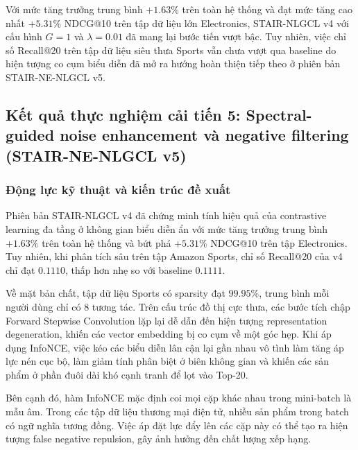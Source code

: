 Với mức tăng trưởng trung bình $+1.63\%$ trên toàn hệ thống và đạt mức tăng cao nhất $+5.31\%$ NDCG@10 trên tập dữ liệu lớn Electronics, STAIR-NLGCL v4 với cấu hình $G=1$ và $\lambda = 0.01$ đã mang lại bước tiến vượt bậc. Tuy nhiên, việc chỉ số Recall@20 trên tập dữ liệu siêu thưa Sports vẫn chưa vượt qua baseline do hiện tượng co cụm biểu diễn đã mở ra hướng hoàn thiện tiếp theo ở phiên bản STAIR-NE-NLGCL v5.

\subsection{Kết quả thực nghiệm cải tiến 5: Spectral-guided noise enhancement và negative filtering (STAIR-NE-NLGCL v5)}

\subsubsection{Động lực kỹ thuật và kiến trúc đề xuất}

Phiên bản STAIR-NLGCL v4 đã chứng minh tính hiệu quả của contrastive learning đa tầng ở không gian biểu diễn ẩn với mức tăng trưởng trung bình $+1.63\%$ trên toàn hệ thống và bứt phá $+5.31\%$ NDCG@10 trên tập Electronics. Tuy nhiên, khi phân tích sâu trên tập Amazon Sports, chỉ số Recall@20 của v4 chỉ đạt $0.1110$, thấp hơn nhẹ so với baseline $0.1111$. 

Về mặt bản chất, tập dữ liệu Sports có sparsity đạt $99.95\%$, trung bình mỗi người dùng chỉ có 8 tương tác. Trên cấu trúc đồ thị cực thưa, các bước tích chập Forward Stepwise Convolution lặp lại dễ dẫn đến hiện tượng representation degeneration, khiến các vector embedding bị co cụm về một góc hẹp. Khi áp dụng InfoNCE, việc kéo các biểu diễn lân cận lại gần nhau vô tình làm tăng áp lực nén cục bộ, làm giảm tính phân biệt ở biên không gian và khiến các sản phẩm ở phần đuôi dài khó cạnh tranh để lọt vào Top-20.

Bên cạnh đó, hàm InfoNCE mặc định coi mọi cặp khác nhau trong mini-batch là mẫu âm. Trong các tập dữ liệu thương mại điện tử, nhiều sản phẩm trong batch có ngữ nghĩa tương đồng. Việc áp đặt lực đẩy lên các cặp này có thể tạo ra hiện tượng false negative repulsion, gây ảnh hưởng đến chất lượng xếp hạng.

